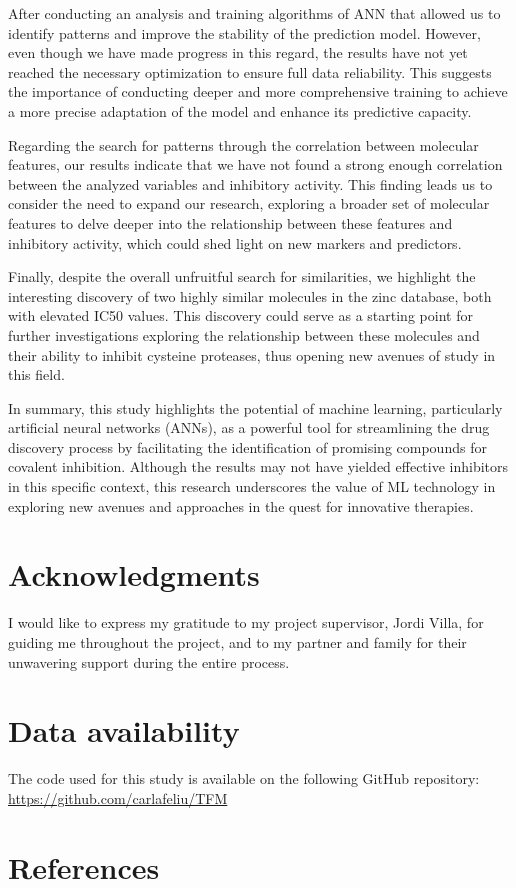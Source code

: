 \documentclass[final,times,twocolumn,article]{elsarticle}
\begin{document}
After conducting an analysis and training algorithms of ANN that allowed us to identify patterns and improve the stability of the prediction model. However, even though we have made progress in this regard, the results have not yet reached the necessary optimization to ensure full data reliability. This suggests the importance of conducting deeper and more comprehensive training to achieve a more precise adaptation of the model and enhance its predictive capacity.

Regarding the search for patterns through the correlation between molecular features, our results indicate that we have not found a strong enough correlation between the analyzed variables and inhibitory activity. This finding leads us to consider the need to expand our research, exploring a broader set of molecular features to delve deeper into the relationship between these features and inhibitory activity, which could shed light on new markers and predictors.

Finally, despite the overall unfruitful search for similarities, we highlight the interesting discovery of two highly similar molecules in the zinc database, both with elevated IC50 values. This discovery could serve as a starting point for further investigations exploring the relationship between these molecules and their ability to inhibit cysteine proteases, thus opening new avenues of study in this field.

In summary, this study highlights the potential of machine learning, particularly artificial neural networks (ANNs), as a powerful tool for streamlining the drug discovery process by facilitating the identification of promising compounds for covalent inhibition. Although the results may not have yielded effective inhibitors in this specific context, this research underscores the value of ML technology in exploring new avenues and approaches in the quest for innovative therapies.

\appendix

\section{Acknowledgments}

I would like to express my gratitude to my project supervisor, Jordi Villa, for guiding me throughout the project, and to my partner and family for their unwavering support during the entire process.

\section{Data availability}

The code used for this study is available on the following GitHub repository: \href{https://github.com/carlafeliu/TFM}{https://github.com/carlafeliu/TFM}


\section{References}
 

\end{document}

